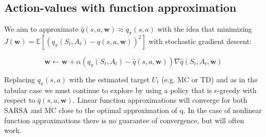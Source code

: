 \subsection{Action-values with function approximation}
We aim to approximate $\hat{q}(s,a,\textbf{w}) \approx q_\pi(s,a)$ with the idea that minimizing $J(\textbf{w}) = \mathbb{E} [(q_\pi(S_t,A_t) - \hat{q}(s,a,\textbf{w}))^{2}]$ with stochastic gradient descent:

	\begin{equation}
	 	\textbf{w} \leftarrow \textbf{w} + \alpha (q_\pi(S_t,A_t) - \hat{q}(s,a,\textbf{w})) \nabla \hat{q}(S_t,A_t,\textbf{w})
	 \end{equation} 

Replacing $q_\pi(s,a)$ with the estimated target $U_t$ (e.g. MC or TD) and as in the tabular case we must continue to explore by using a policy that is $\epsilon$-greedy with respect to $\hat{q}(s,a,\textbf{w})$. Linear function approximations will converge for both SARSA and MC close to the optimal approximation of q. In the case of nonlinear function approximations there is no guarantee of convergence, but will often work.

